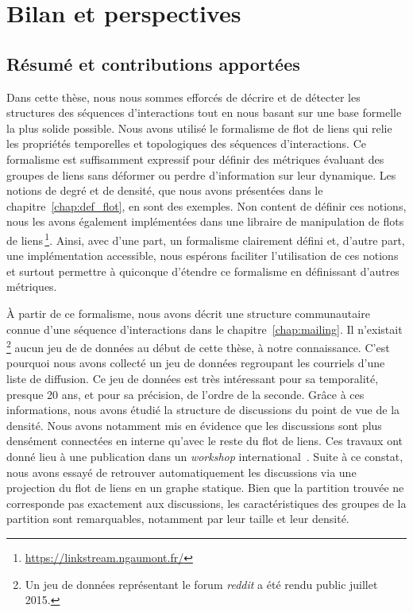 \chapter{Bilan et perspectives}
\label{Conclusion}

\section{Résumé et contributions apportées}

Dans cette thèse, nous nous sommes efforcés de décrire et de détecter les structures des séquences d'interactions tout en nous basant sur une base formelle la plus solide possible.
Nous avons utilisé le formalisme de flot de liens qui relie les propriétés temporelles et topologiques des séquences d'interactions.
Ce formalisme est suffisamment expressif pour définir des métriques évaluant des groupes de liens sans déformer ou perdre d'information sur leur dynamique.
Les notions de degré et de densité, que nous avons présentées dans le chapitre~\ref{chap:def_flot}, en sont des exemples.
Non content de définir ces notions, nous les avons également implémentées dans une libraire de manipulation de flots de liens\,\footnote{\url{https://linkstream.ngaumont.fr/}}.
Ainsi, avec d'une part, un formalisme clairement défini et, d'autre part, une implémentation accessible, nous espérons faciliter l'utilisation de ces notions et surtout permettre à quiconque d'étendre ce formalisme en définissant d'autres métriques.

\bigskip

\`A partir de ce formalisme, nous avons décrit une structure communautaire connue d'une séquence d'interactions dans le chapitre~\ref{chap:mailing}.
Il n'existait\,\footnote{Un jeu de données représentant le forum \emph{reddit} a été rendu public juillet 2015.} aucun jeu de de données au début de cette thèse, à notre connaissance.
C'est pourquoi nous avons collecté un jeu de données regroupant les courriels d'une liste de diffusion.
Ce jeu de données est très intéressant pour sa temporalité, presque 20 ans, et pour sa précision, de l'ordre de la seconde.
Grâce à ces informations, nous avons étudié la structure de discussions du point de vue de la densité.
Nous avons notamment mis en évidence que les discussions sont plus densément connectées en interne qu'avec le reste du flot de liens.
Ces travaux ont donné lieu à une publication dans un \emph{workshop} international~\cite{Gaumont2016}.
Suite à ce constat, nous avons essayé de retrouver automatiquement les discussions via une projection du flot de liens en un graphe statique.
Bien que la partition trouvée ne corresponde pas exactement aux discussions, les caractéristiques des groupes de la partition sont remarquables, notamment par leur taille et leur densité.


